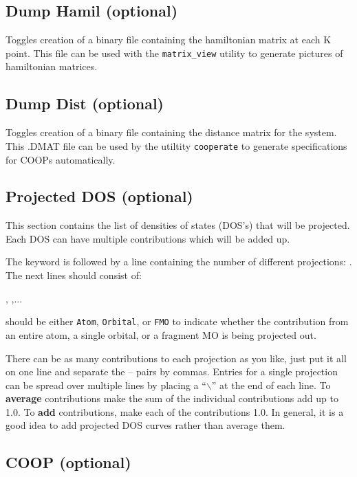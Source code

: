 \subsection{{\sf Dump Hamil} (optional)}

Toggles creation of a binary file containing the hamiltonian matrix at
each K point.  This file can be used with the {\tt matrix\_view} utility to
generate pictures of hamiltonian matrices.

\subsection{{\sf Dump Dist} (optional)}

Toggles creation of a binary file containing the distance matrix
for the system.  This .DMAT file can be used by the utiltity
{\tt cooperate} to generate specifications for COOPs automatically.


\subsection{{\sf Projected DOS} (optional)}

This section contains the list of densities of states (DOS's) that
will be projected.  Each DOS can have multiple contributions which
will be added up.

The keyword is followed by a line containing the number of different
projections: . The next  lines
should consist of:

  , 
,...

 should be either {\tt Atom}, {\tt Orbital}, or {\tt FMO} to indicate
whether the contribution from an entire atom, a single orbital, or a
fragment MO is being projected out.

There can be as many contributions to each projection as
you like, just put it all on one line and separate the
-- pairs by commas.
Entries for a single projection can be spread over multiple lines by placing a ``$\backslash$'' at the end of each line.
To {\bf average} contributions make the sum of the individual
contributions add up to 1.0.  To {\bf add} contributions, make each of
the contributions 1.0.  In general, it is a good idea to add projected
DOS curves rather than average them.

\subsection{{\sf COOP} (optional)}

